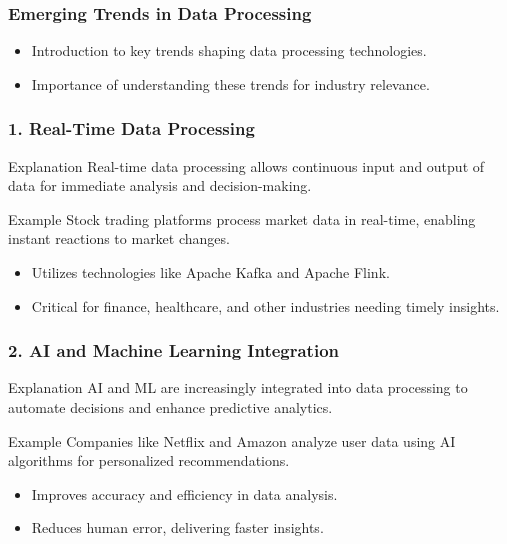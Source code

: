\documentclass{beamer}
\begin{document}
\begin{frame}[fragile]
    \frametitle{Emerging Trends in Data Processing}
    \begin{itemize}
        \item Introduction to key trends shaping data processing technologies.
        \item Importance of understanding these trends for industry relevance.
    \end{itemize}
\end{frame}

\begin{frame}[fragile]
    \frametitle{1. Real-Time Data Processing}
    \begin{block}{Explanation}
        Real-time data processing allows continuous input and output of data for immediate analysis and decision-making.
    \end{block}
    \begin{exampleblock}{Example}
        Stock trading platforms process market data in real-time, enabling instant reactions to market changes.
    \end{exampleblock}
    \begin{itemize}
        \item Utilizes technologies like Apache Kafka and Apache Flink.
        \item Critical for finance, healthcare, and other industries needing timely insights.
    \end{itemize}
\end{frame}

\begin{frame}[fragile]
    \frametitle{2. AI and Machine Learning Integration}
    \begin{block}{Explanation}
        AI and ML are increasingly integrated into data processing to automate decisions and enhance predictive analytics.
    \end{block}
    \begin{exampleblock}{Example}
        Companies like Netflix and Amazon analyze user data using AI algorithms for personalized recommendations.
    \end{exampleblock}
    \begin{itemize}
        \item Improves accuracy and efficiency in data analysis.
        \item Reduces human error, delivering faster insights.
    \end{itemize}
\end{frame}
\end{document}

